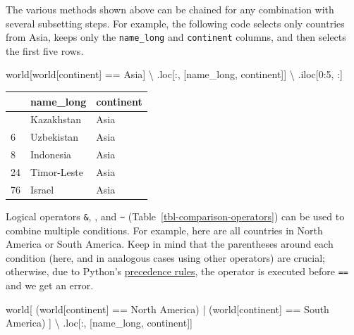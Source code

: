 \documentclass[
  letterpaper,
]{krantz}
\newenvironment{Shaded}{\begin{snugshade}}{\end{snugshade}}
\newcommand{\DecValTok}[1]{\textcolor[rgb]{0.68,0.00,0.00}{#1}}
\newcommand{\NormalTok}[1]{\textcolor[rgb]{0.00,0.23,0.31}{#1}}
\newcommand{\OperatorTok}[1]{\textcolor[rgb]{0.37,0.37,0.37}{#1}}
\newcommand{\StringTok}[1]{\textcolor[rgb]{0.13,0.47,0.30}{#1}}
\begin{document}
The various methods shown above can be chained for any combination with
several subsetting steps. For example, the following code selects only
countries from Asia, keeps only the \texttt{name\_long} and
\texttt{continent} columns, and then selects the first five rows.

\begin{Shaded}
\begin{Highlighting}[]
\NormalTok{world[world[}\StringTok{\textquotesingle{}continent\textquotesingle{}}\NormalTok{] }\OperatorTok{==} \StringTok{\textquotesingle{}Asia\textquotesingle{}}\NormalTok{]  }\OperatorTok{\textbackslash{}}
\NormalTok{    .loc[:, [}\StringTok{\textquotesingle{}name\_long\textquotesingle{}}\NormalTok{, }\StringTok{\textquotesingle{}continent\textquotesingle{}}\NormalTok{]]  }\OperatorTok{\textbackslash{}}
\NormalTok{    .iloc[}\DecValTok{0}\NormalTok{:}\DecValTok{5}\NormalTok{, :]}
\end{Highlighting}
\end{Shaded}

\begin{longtable}[]{@{}lll@{}}
\toprule\noalign{}
& name\_long & continent \\
\midrule\noalign{}
\endhead
\bottomrule\noalign{}
\endlastfoot
5 & Kazakhstan & Asia \\
6 & Uzbekistan & Asia \\
8 & Indonesia & Asia \\
24 & Timor-Leste & Asia \\
76 & Israel & Asia \\
\end{longtable}

Logical operators \texttt{\&}, \texttt{\textbar{}}, and
\texttt{\textasciitilde{}} (Table~\ref{tbl-comparison-operators}) can be
used to combine multiple conditions. For example, here are all countries
in North America or South America. Keep in mind that the parentheses
around each condition (here, and in analogous cases using other
operators) are crucial; otherwise, due to Python's
\href{https://docs.python.org/3/reference/expressions.html\#operator-precedence}{precedence
rules}, the \texttt{\textbar{}} operator is executed before \texttt{==}
and we get an error.

\begin{Shaded}
\begin{Highlighting}[]
\NormalTok{world[}
\NormalTok{        (world[}\StringTok{\textquotesingle{}continent\textquotesingle{}}\NormalTok{] }\OperatorTok{==} \StringTok{\textquotesingle{}North America\textquotesingle{}}\NormalTok{) }\OperatorTok{|} 
\NormalTok{        (world[}\StringTok{\textquotesingle{}continent\textquotesingle{}}\NormalTok{] }\OperatorTok{==}  \StringTok{\textquotesingle{}South America\textquotesingle{}}\NormalTok{)}
\NormalTok{    ]  }\OperatorTok{\textbackslash{}}
\NormalTok{    .loc[:, [}\StringTok{\textquotesingle{}name\_long\textquotesingle{}}\NormalTok{, }\StringTok{\textquotesingle{}continent\textquotesingle{}}\NormalTok{]]}
\end{Highlighting}
\end{Shaded}
\end{document}
